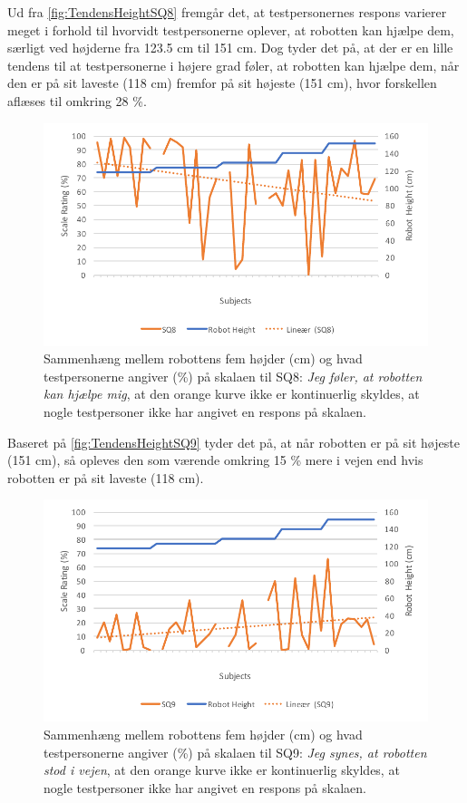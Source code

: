 \noindent
%
Ud fra \autoref{fig:TendensHeightSQ8} fremgår det, at testpersonernes respons varierer meget i forhold til hvorvidt testpersonerne oplever, at robotten kan hjælpe dem, særligt ved højderne fra 123.5 cm til 151 cm. Dog tyder det på, at der er en lille tendens til at testpersonerne i højere grad føler, at robotten kan hjælpe dem, når den er på sit laveste (118 cm) fremfor på sit højeste (151 cm), hvor forskellen aflæses til omkring 28 \%.
%
\begin{figure}[H]
\centering
\includegraphics[width=\textwidth]{Figure/DatabehandlingSkalaer/TendensHeight/HeightSQ8}
\caption{Sammenhæng mellem robottens fem højder (cm) og hvad testpersonerne angiver (\%) på skalaen til SQ8: \textit{Jeg føler, at robotten kan hjælpe mig}, at den orange kurve ikke er kontinuerlig skyldes, at nogle testpersoner ikke har angivet en respons på skalaen.}
\label{fig:TendensHeightSQ8}
\end{figure}
\noindent
%
Baseret på \autoref{fig:TendensHeightSQ9} tyder det på, at når robotten er på sit højeste (151 cm), så opleves den som værende omkring 15 \% mere i vejen end hvis robotten er på sit laveste (118 cm). 
%
\begin{figure}[H]
\centering
\includegraphics[width=\textwidth]{Figure/DatabehandlingSkalaer/TendensHeight/HeightSQ9}
\caption{Sammenhæng mellem robottens fem højder (cm) og hvad testpersonerne angiver (\%) på skalaen til SQ9: \textit{Jeg synes, at robotten stod i vejen}, at den orange kurve ikke er kontinuerlig skyldes, at nogle testpersoner ikke har angivet en respons på skalaen.}
\label{fig:TendensHeightSQ9}
\end{figure}
